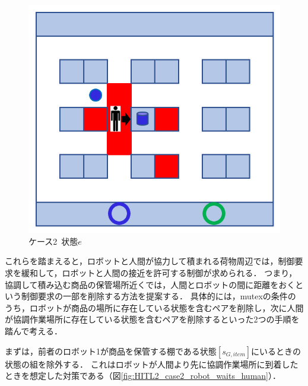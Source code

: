 \begin{figure}[!t]
    \centering
    \includegraphics[scale=0.3]{figures/HITL2_case2_e.png}
    \caption{ケース2\ 状態$e$}
    \label{fig:HITL2_case2_e}
\end{figure}

これらを踏まえると，ロボットと人間が協力して積まれる荷物周辺では，制御要求を緩和して，ロボットと人間の接近を許可する制御が求められる．
つまり，協調して積み込む商品の保管場所近くでは，人間とロボットの間に距離をおくという制御要求の一部を削除する方法を提案する．
具体的には，mutexの条件のうち，ロボットが商品の場所に存在している状態を含むペアを削除し，次に人間が協調作業場所に存在している状態を含むペアを削除するといった2つの手順を踏んで考える．


まずは，前者のロボット1が商品を保管する棚である状態$[s_{G,item}]$にいるときの状態の組を除外する．
これはロボットが人間より先に協調作業場所に到着したときを想定した対策である（図\ref{fig:HITL2_case2_robot_waits_human}）．

